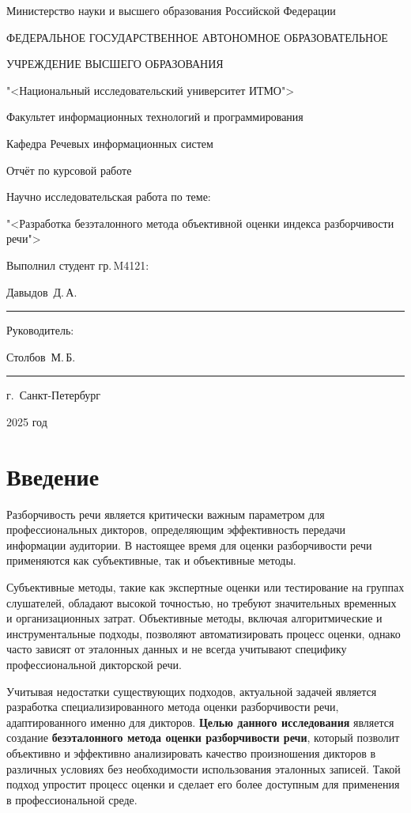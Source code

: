 \documentclass[oneside, final, 14pt]{extarticle}
\begin{document}
\begin{titlepage}
  \centerline{Министерство науки и высшего образования Российской Федерации}
  \medskip
  \centerline{ФЕДЕРАЛЬНОЕ ГОСУДАРСТВЕННОЕ АВТОНОМНОЕ ОБРАЗОВАТЕЛЬНОЕ}
  \medskip
  \centerline{УЧРЕЖДЕНИЕ ВЫСШЕГО ОБРАЗОВАНИЯ}
  \medskip
  \centerline{"<Национальный исследовательский университет ИТМО">}
  \vfill
  \centerline{Факультет информационных технологий и программирования}
  \medskip
  \centerline{Кафедра Речевых информационных систем}
  \vfill
  \vfill
  \centerline{Отчёт по курсовой работе}
  \vfill
  \centerline{Научно исследовательская работа по теме:}
  \medskip
  \centerline{"<Разработка безэталонного метода объективной оценки индекса разборчивости речи">}
  \vfill
  \null \hfill
  \begin{minipage}{0.4\textwidth}
    Выполнил студент гр.\,M4121:
	\par
	\medskip
	Давыдов~Д.\,А.\,
	\rule{3.5cm}{0.25pt}
	\par
	\medskip
	Руководитель:
	\par
	\medskip
	Столбов~М.\,Б.\,
	\rule{3.5cm}{0.25pt}
  \end{minipage}
  \vfill
  \centerline{г.~Санкт-Петербург}
  \centerline{2025 год}
\end{titlepage}
\setcounter{page}{2}

\tableofcontents

\newpage
\section*{Введение}

Разборчивость речи является критически важным параметром для профессиональных дикторов, определяющим эффективность передачи информации аудитории. В настоящее время для оценки разборчивости речи применяются как субъективные, так и объективные методы.

Субъективные методы, такие как экспертные оценки или тестирование на группах слушателей, обладают высокой точностью, но требуют значительных временных и организационных затрат. Объективные методы, включая алгоритмические и инструментальные подходы, позволяют автоматизировать процесс оценки, однако часто зависят от эталонных данных и не всегда учитывают специфику профессиональной дикторской речи.

Учитывая недостатки существующих подходов, актуальной задачей является разработка специализированного метода оценки разборчивости речи, адаптированного именно для дикторов. \textbf{Целью данного исследования} является создание \textbf{безэталонного метода оценки разборчивости речи}, который позволит объективно и эффективно анализировать качество произношения дикторов в различных условиях без необходимости использования эталонных записей. Такой подход упростит процесс оценки и сделает его более доступным для применения в профессиональной среде.
\end{document}

